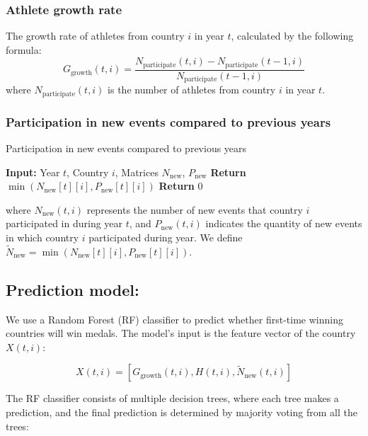 \documentclass{mcmthesis}
\begin{document}
	\subsubsection{Athlete growth rate}
	The growth rate of athletes from country $i$ in year $t$, calculated by the following formula:
	\[
	G_{\text{growth}}(t,i) = \frac{N_{\text{participate}}(t,i) - N_{\text{participate}}(t-1,i)}{N_{\text{participate}}(t-1,i)}
	\]
	where $N_{\text{participate}}(t,i)$ is the number of athletes from country $i$ in year $t$.
	
	
	\subsubsection{Participation in new events compared to previous years} 
	\begin{algorithm}
		\caption{Participation in new events compared to previous years}
		\begin{algorithmic}[1]
			\State \textbf{Input:} Year \( t \), Country \( i \), Matrices \( N_{\text{new}} \), \( P_{\text{new}} \)
			\State \textbf{Return} $\min(N_{\text{new}}[t][i], P_{\text{new}}[t][i])$
			\EndIf
			\EndFor
			\State \textbf{Return} 0
		\end{algorithmic}
	\end{algorithm}
	
	where \( N_{\text{new}}(t,i) \) represents the number of new events that country \( i \) participated in during year \( t \), and \( P_{\text{new}}(t,i) \) indicates the quantity of new events in which country \(i\) participated during year. We define \( \tilde{N}_{\text{new}} = \min(N_{\text{new}}[t][i], P_{\text{new}}[t][i]) \).
	
	
	
	
	
	
	\subsection{Prediction model:}  
	We use a Random Forest (RF) classifier to predict whether first-time winning countries will win medals. The model’s input is the feature vector of the country \( X(t,i) \):
	
	\[
	X(t,i) = [G_{\text{growth}}(t,i), H(t,i), \tilde{N}_{\text{new}}(t,i)]
	\]
	
	The RF classifier consists of multiple decision trees, where each tree makes a prediction, and the final prediction is determined by majority voting from all the trees:
	
\end{document}
